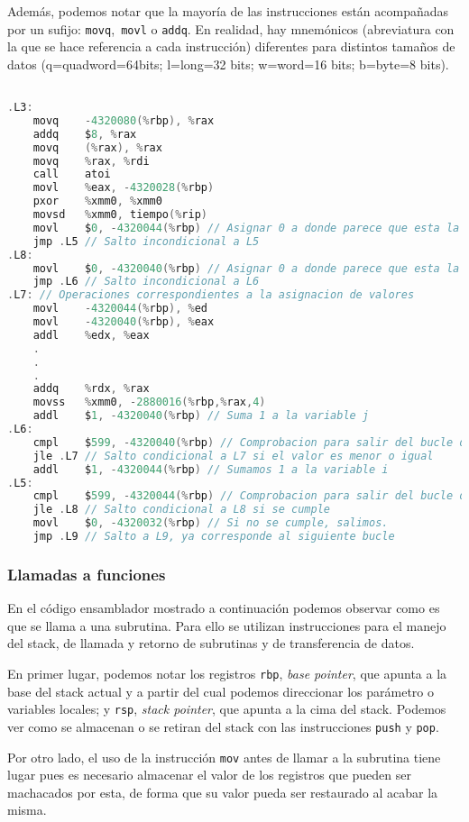 \documentclass[10pt,a4paper]{article}
\begin{document}
Además, podemos notar que la mayoría de las instrucciones están acompañadas por un sufijo: \texttt{movq},\texttt{ movl} o \texttt{addq}. En realidad, hay mnemónicos (abreviatura con la que se hace referencia a cada instrucción) diferentes para distintos tamaños de datos (q=quadword=64bits; l=long=32 bits; w=word=16 bits; b=byte=8 bits).
\begin{lstlisting}[language=C]

.L3:
	movq	-4320080(%rbp), %rax
	addq	$8, %rax
	movq	(%rax), %rax
	movq	%rax, %rdi
	call	atoi
	movl	%eax, -4320028(%rbp)
	pxor	%xmm0, %xmm0
	movsd	%xmm0, tiempo(%rip)
	movl	$0, -4320044(%rbp) // Asignar 0 a donde parece que esta la variable i
	jmp	.L5 // Salto incondicional a L5			
.L8:
	movl	$0, -4320040(%rbp) // Asignar 0 a donde parece que esta la variable j
	jmp	.L6 // Salto incondicional a L6
.L7: // Operaciones correspondientes a la asignacion de valores
	movl	-4320044(%rbp), %ed 
	movl	-4320040(%rbp), %eax
	addl	%edx, %eax
	.
	.
	.
	addq	%rdx, %rax
	movss	%xmm0, -2880016(%rbp,%rax,4)
	addl	$1, -4320040(%rbp) // Suma 1 a la variable j 
.L6:
	cmpl	$599, -4320040(%rbp) // Comprobacion para salir del bucle de j 
	jle	.L7 // Salto condicional a L7 si el valor es menor o igual
	addl	$1, -4320044(%rbp) // Sumamos 1 a la variable i
.L5:
	cmpl	$599, -4320044(%rbp) // Comprobacion para salir del bucle de i
	jle	.L8 // Salto condicional a L8 si se cumple
	movl	$0, -4320032(%rbp) // Si no se cumple, salimos. 
	jmp	.L9 // Salto a L9, ya corresponde al siguiente bucle

\end{lstlisting}

\subsubsection{Llamadas a funciones}
En el código ensamblador mostrado a continuación podemos observar como es que se llama a una subrutina. Para ello se utilizan instrucciones para el manejo del stack, de llamada y retorno de subrutinas y de transferencia de datos. 

En primer lugar, podemos notar los registros \texttt{rbp}, \textit{base pointer}, que apunta a la base del stack actual y a partir del cual podemos direccionar los parámetro o variables locales; y \texttt{rsp}, \textit{stack pointer}, que apunta a la cima del stack. Podemos ver como se almacenan o se retiran del stack con las instrucciones \texttt{push} y \texttt{pop}.


Por otro lado, el uso de la instrucción \texttt{mov} antes de llamar a la subrutina tiene lugar pues es necesario almacenar el valor de los registros que pueden ser machacados por esta, de forma que su valor pueda ser restaurado al acabar la misma. 
\end{document}
